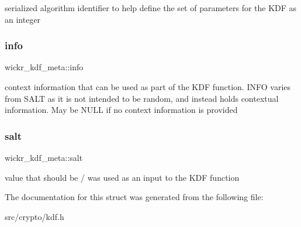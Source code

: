 serialized algorithm identifier to help define the set of parameters for the K\+DF as an integer \mbox{\label{structwickr__kdf__meta_abf3edef445c8849c356d1282e49033f4}} 
\subsubsection{\texorpdfstring{info}{info}}
{\footnotesize\ttfamily wickr\+\_\+kdf\+\_\+meta\+::info}

context information that can be used as part of the K\+DF function. I\+N\+FO varies from S\+A\+LT as it is not intended to be random, and instead holds contextual information. May be N\+U\+LL if no context information is provided \mbox{\label{structwickr__kdf__meta_a315c54ee4578a01266a4e7352a52d459}} 
\subsubsection{\texorpdfstring{salt}{salt}}
{\footnotesize\ttfamily wickr\+\_\+kdf\+\_\+meta\+::salt}

value that should be / was used as an input to the K\+DF function 

The documentation for this struct was generated from the following file\+:\begin{DoxyCompactItemize}
\item 
src/crypto/kdf.\+h\end{DoxyCompactItemize}
